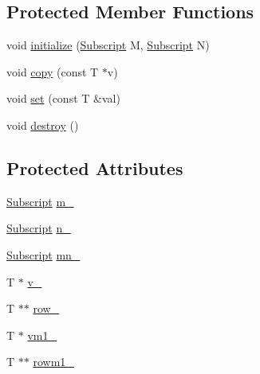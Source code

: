 \subsection*{Protected Member Functions}
\begin{DoxyCompactItemize}
\item 
void \hyperlink{classTNT_1_1Matrix_abc963d455626c3f0a170b2df8d40c39a}{initialize} (\hyperlink{namespaceTNT_af22e3f1460e145c04ce4e7d701e4c1c1}{Subscript} M, \hyperlink{namespaceTNT_af22e3f1460e145c04ce4e7d701e4c1c1}{Subscript} N)
\item 
void \hyperlink{classTNT_1_1Matrix_ab14f23495e591b50b73574e154a178a7}{copy} (const T $\ast$v)
\item 
void \hyperlink{classTNT_1_1Matrix_a9bafeab51d069cf4bf310540e0a05df6}{set} (const T \&val)
\item 
void \hyperlink{classTNT_1_1Matrix_a44f6121414c93eb548b0bd82a03e7ecc}{destroy} ()
\end{DoxyCompactItemize}
\subsection*{Protected Attributes}
\begin{DoxyCompactItemize}
\item 
\hyperlink{namespaceTNT_af22e3f1460e145c04ce4e7d701e4c1c1}{Subscript} \hyperlink{classTNT_1_1Matrix_a72e92c4629de6a79ac12a1039f461b6f}{m\-\_\-}
\item 
\hyperlink{namespaceTNT_af22e3f1460e145c04ce4e7d701e4c1c1}{Subscript} \hyperlink{classTNT_1_1Matrix_ab7dc73d05542cc97be2280a50ac1374c}{n\-\_\-}
\item 
\hyperlink{namespaceTNT_af22e3f1460e145c04ce4e7d701e4c1c1}{Subscript} \hyperlink{classTNT_1_1Matrix_a1211bb821e4b22be124e16b1123f769c}{mn\-\_\-}
\item 
T $\ast$ \hyperlink{classTNT_1_1Matrix_a6a7ca17d4336b010fbde3036bbe54093}{v\-\_\-}
\item 
T $\ast$$\ast$ \hyperlink{classTNT_1_1Matrix_a9b970ee02290aa814d67ca6e8a4ebc60}{row\-\_\-}
\item 
T $\ast$ \hyperlink{classTNT_1_1Matrix_a7bee192ea8a850399382ff79c9d176bf}{vm1\-\_\-}
\item 
T $\ast$$\ast$ \hyperlink{classTNT_1_1Matrix_a099ebf68bd8eb98cda5844ca99dbf614}{rowm1\-\_\-}
\end{DoxyCompactItemize}


